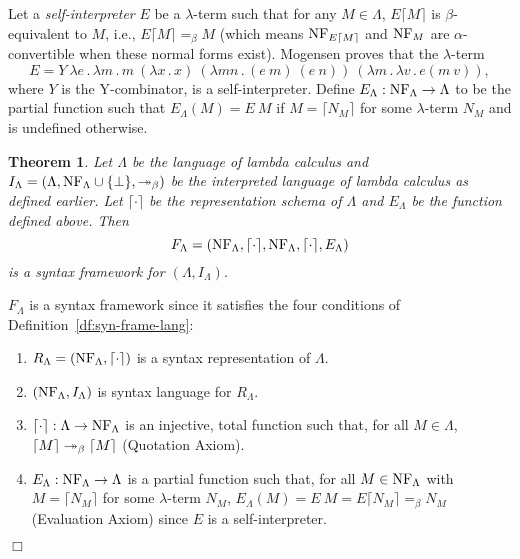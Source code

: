 \documentclass[11pt,fleqn]{article}
\newcommand{\be}{\begin{enumerate}}
\newcommand{\ee}{\end{enumerate}}
\newcommand{\bsp}{\begin{sloppypar}}
\newcommand{\esp}{\end{sloppypar}}
\newcommand{\dblsp}{\ \ }
\newcommand{\bsynbrack}[1]{\lceil#1\rceil}
\newcommand{\mdot}{\mathrel.}
\newcommand{\tarrow}{\rightarrow}
\newtheorem{thm}{Theorem}[subsection]
\newenvironment{proof}{\par\noindent{\bf Proof\dblsp}}{\hfill$\Box$}
\begin{document}
Let a {\em self-interpreter} $E$ be a $\lambda$-term such that for any
$M \in {\Lambda}$, $E \bsynbrack{M}$ is $\beta$-equivalent to $M$,
i.e., $E \bsynbrack{M} =_{\beta} M$ (which means ${\rm NF}_{E
  \bsynbrack{M}}$ and ${\rm NF}_M$ are $\alpha$-convertible when these
normal forms exist).  Mogensen proves that the $\lambda$-term
\[E = Y ~ \lambda e \mdot \lambda m \mdot m ~ (\lambda x \mdot x) ~ (\lambda m n \mdot (e~m)~(e~n)) ~ (\lambda m \mdot \lambda v \mdot e(m~v)),\]
\noindent where $Y$ is the Y-combinator, is a self-interpreter.
Define $E_{\Lambda} : \nflambda \tarrow \Lambda$ to be the partial
function such that $E_{\Lambda}(M) = E~M$ if $M = \bsynbrack{N_M}$ for
some $\lambda$-term $N_M$ and is undefined otherwise.

\iffalse
The immediate implementation of $E$ for the syntax representation $R_A$ is as follows:
\setcounter{equation}{0}
\begin{eqnarray}
E_A[{\tt Var}(x)] & = & x \\
E_A[{\tt App}(V_A(M), V_A(N))] & = & E_A[M] ~ E_A[N]\\
E_A[{\tt Abs}(\lambda x \mdot V_A(M))] & = & \lambda v \mdot E_A[M ~ v]
\end{eqnarray}
\fi

\begin{thm}\bsp
Let $\Lambda$ be the language of lambda calculus and $I_{\Lambda} =
(\Lambda, {\rm NF}_{\Lambda} \cup \{\bot\}, \twoheadrightarrow_{\beta})$ be the interpreted language of
lambda calculus as defined earlier. Let $\bsynbrack{\cdot}$ be the
representation schema of $\Lambda$ and $E_{\Lambda}$ be the function
defined above.  Then \[F_{\Lambda} = (\nflambda, \bsynbrack{\cdot},
\nflambda, \bsynbrack{\cdot}, E_{\Lambda})\] is a syntax framework for
$(\Lambda,I_{\Lambda})$. \esp
\end{thm}

\begin{proof}
$F_{\Lambda}$ is a syntax framework since it satisfies the four
  conditions of Definition~\ref{df:syn-frame-lang}:

\be

  \item $R_{\Lambda} = (\nflambda, \bsynbrack{\cdot})$ is a syntax
    representation of $\Lambda$.

  \item $({\rm NF}_{\Lambda}, I_{\Lambda})$ is syntax language for
    $R_{\Lambda}$.

  \item $\bsynbrack{\cdot} : \Lambda \tarrow \nflambda$ is an
    injective, total function such that, for all $M \in \Lambda$,
    $\bsynbrack{M} \betaarrow \bsynbrack{M}$ (Quotation Axiom).

  \item $E_{\Lambda} : \nflambda \tarrow \Lambda$ is a partial
    function such that, for all $M \in {\rm NF}_{\Lambda}$ with $M =
    \bsynbrack{N_M}$ for some $\lambda$-term $N_M$, $E_{\Lambda}(M) =
    E~M = E\bsynbrack{N_M} =_{\beta} N_M$ (Evaluation Axiom) since $E$
    is a self-interpreter.

\ee
\end{proof}
\end{document}
